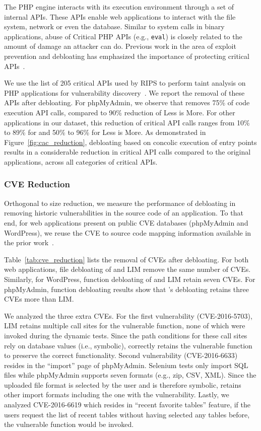{The PHP engine interacts with its execution environment through a set of internal APIs. 
These APIs enable web applications to interact with the file system, network or even the database. 
Similar to system calls in binary applications, abuse of Critical PHP APIs (e.g., \texttt{eval}) is closely related to the amount of damage an attacker can do. 
Previous work in the area of exploit prevention and debloating has emphasized the importance of protecting critical APIs~\cite{Mishra2018, pappas2012kbouncer, fratric2012ropguard, bulekov2021saphire}. 

We use the list of 205 critical APIs used by RIPS to perform taint analysis on PHP applications for vulnerability discovery~\cite{dahse2010rips}. 
We report the removal of these APIs after debloating. 
For phpMyAdmin, we observe that \animatedead{} removes 75\% of code execution API calls, compared to 90\% reduction of Less is More. 
For other applications in our dataset, this reduction of critical API calls ranges from 10\% to 89\% for \animatedead{} and 50\% to 96\% for Less is More. 
As demonstrated in Figure~\ref{fig:cac_reduction}, debloating based on concolic execution of entry points results in a considerable reduction in critical API calls compared to the original applications, across all categories of critical APIs. 

\subsubsection*{CVE Reduction}
Orthogonal to size reduction, we measure the performance of debloating in removing historic vulnerabilities in the source code of an application. 
To that end, for web applications present on public CVE databases (phpMyAdmin and WordPress), we reuse the CVE to source code mapping information available in the prior work~\cite{azad2019less}.

Table~\ref{tab:cve_reduction} lists the removal of CVEs after debloating. 
For both web applications, file debloating of \animatedead{} and LIM remove the same number of CVEs. 
Similarly, for WordPress, function debloating of \animatedead{} and LIM retain seven CVEs. 
For phpMyAdmin, function debloating results show that \animatedead{}'s debloating retains three CVEs more than LIM. 

We analyzed the three extra CVEs. 
For the first vulnerability (CVE-2016-5703), LIM retains multiple call sites for the vulnerable function, none of which were invoked during the dynamic tests. 
Since the path conditions for these call sites rely on database values (i.e., symbolic), \animatedead{} correctly retains the vulnerable function to preserve the correct functionality. 
Second vulnerability (CVE-2016-6633) resides in the ``import'' page of phpMyAdmin. 
Selenium tests only import SQL files while phpMyAdmin supports seven formats (e.g., zip, CSV, XML). 
Since the uploaded file format is selected by the user and is therefore symbolic, \animatedead{} retains other import formats including the one with the vulnerability. 
Lastly, we analyzed CVE-2016-6619 which resides in ``recent favorite tables'' feature, if the users request the list of recent tables without having selected any tables before, the vulnerable function would be invoked. 

}
